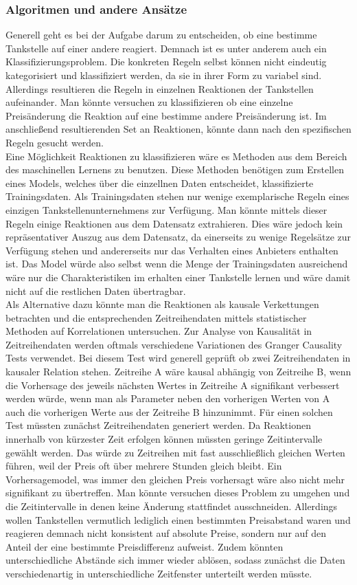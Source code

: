 \documentclass[12pt,a4paper,bibliography=totocnumbered,listof=totocnumbered]{scrartcl}
\begin{document}
\subsubsection{Algoritmen und andere Ansätze}
Generell geht es bei der Aufgabe darum zu entscheiden, ob eine bestimme Tankstelle auf einer andere reagiert. Demnach ist es unter anderem auch ein Klassifizierungsproblem. Die konkreten Regeln selbst können nicht eindeutig kategorisiert und klassifiziert werden, da sie in ihrer Form zu variabel sind. Allerdings resultieren die Regeln in einzelnen Reaktionen der Tankstellen aufeinander. Man könnte versuchen zu klassifizieren ob eine einzelne Preisänderung die Reaktion auf eine bestimme andere Preisänderung ist. Im anschließend resultierenden Set an Reaktionen, könnte dann nach den spezifischen Regeln gesucht werden.\\
Eine Möglichkeit Reaktionen zu klassifizieren wäre es Methoden aus dem Bereich des maschinellen Lernens zu benutzen. Diese Methoden benötigen zum Erstellen eines Models, welches über die einzellnen Daten entscheidet, klassifizierte Trainingsdaten.
Als Trainingsdaten stehen nur wenige exemplarische Regeln eines einzigen Tankstellenunternehmens zur Verfügung. Man könnte mittels dieser Regeln einige Reaktionen aus dem Datensatz extrahieren. Dies wäre jedoch kein repräsentativer Auszug aus dem Datensatz, da einerseits zu wenige Regelsätze zur Verfügung stehen und andererseits nur das Verhalten eines Anbieters enthalten ist. Das Model würde also selbst wenn die Menge der Trainingsdaten ausreichend wäre nur die Charakteristiken im erhalten einer Tankstelle lernen und wäre damit nicht auf die restlichen Daten übertragbar.\\
Als Alternative dazu könnte man die Reaktionen als kausale Verkettungen betrachten und die entsprechenden Zeitreihendaten mittels statistischer Methoden auf Korrelationen untersuchen. Zur Analyse von Kausalität in Zeitreihendaten werden oftmals verschiedene Variationen des Granger Causality Tests verwendet. Bei diesem Test wird generell geprüft ob zwei Zeitreihendaten in kausaler Relation stehen. Zeitreihe A wäre kausal abhängig von Zeitreihe B, wenn die Vorhersage des jeweils nächsten Wertes in Zeitreihe A signifikant verbessert werden würde, wenn man als Parameter neben den vorherigen Werten von A auch die vorherigen Werte aus der Zeitreihe B hinzunimmt. Für einen solchen Test müssten zunächst Zeitreihendaten generiert werden. Da Reaktionen innerhalb von kürzester Zeit erfolgen können müssten geringe Zeitintervalle gewählt werden. Das würde zu Zeitreihen mit fast ausschließlich gleichen Werten führen, weil der Preis oft über mehrere Stunden gleich bleibt. Ein Vorhersagemodel, was immer den gleichen Preis vorhersagt wäre also nicht mehr signifikant zu übertreffen. Man könnte versuchen dieses Problem zu umgehen und die Zeitintervalle in denen keine Änderung stattfindet ausschneiden. Allerdings wollen Tankstellen vermutlich lediglich einen bestimmten Preisabstand waren und reagieren demnach nicht konsistent auf absolute Preise, sondern nur auf den Anteil der eine bestimmte Preisdifferenz aufweist. Zudem könnten unterschiedliche Abstände sich immer wieder ablösen, sodass zunächst die Daten verschiedenartig in unterschiedliche Zeitfenster unterteilt werden müsste.\\
\end{document}
